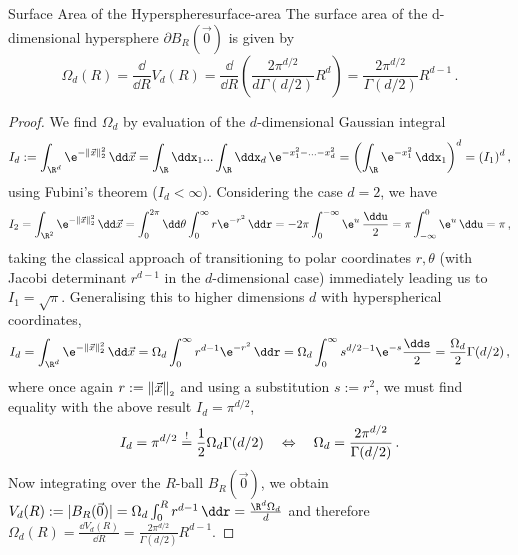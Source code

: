 \begin{lemma}{Surface Area of the Hypersphere}{surface-area}
  The surface area of the d-dimensional hypersphere $\partial B_R(\vec{0})$ is given by
  $$\Omega_{d}(R) = \frac{\dd}{\dd R} V_d(R) = \frac{\dd}{\dd R} \left(\frac{2 \pi^{d/2}}{d \Gamma(d/2)} R^d\right) = \frac{2\pi^{d/2}}{\Gamma({d/2})} R^{d-1}\,.$$
\end{lemma}
\begin{proof}
  We find $\Omega_d$ by evaluation of the $d$-dimensional Gaussian integral
  $$I_d := \int_{\R^d} \e^{-\norm{\vec{x}}^2}\,\dd\vec{x} = \int_{\R} \ddx_1 ... \int_{\R} \ddx_d\, \e^{-x_1^2-...-x_d^2} = \left(\int_{\R} \e^{-x_1^2} \,\ddx_1\right)^d = (I_1)^d\,,$$
  using Fubini's theorem ($I_d < \infty$).
  Considering the case $d = 2$, we have
  $$I_2 = \int_{\R^2} \e^{-\norm{\vec{x}}^2} \,\dd\vec{x} = \int_0^{2\pi} \dd\theta \int_0^\infty r \e^{-r^2} \,\ddr = -2\pi \int_{0}^{-\infty} \e^u \,\frac{\ddu}{2} = \pi \int_{-\infty}^0 \e^u \,\ddu = \pi\,,$$
  taking the classical approach of transitioning to polar coordinates $r, \theta$ (with Jacobi determinant $r^{d-1}$ in the $d$-dimensional case) immediately leading us to $I_1 = \sqrt{\pi}$. Generalising this to higher dimensions $d$ with hyperspherical coordinates,
  $$I_d = \int_{\R^d} \e^{-\norm{\vec{x}}^2} \,\dd\vec{x} = \Omega_d \int_0^\infty r^{d-1} \e^{-r^2}\,\ddr = \Omega_d \int_0^\infty s^{{d/2}-1} \e^{-s} \frac{\dds}{2} = \frac{\Omega_d}{2} \Gamma(d/2)\,,$$
  where once again $r := \left\lVert\vec{x}\right\rVert_{\scriptscriptstyle 2}$ and using a substitution $s := r^2$, we must find equality with the above result $I_d = \pi^{d/2}$,
  $$I_d = \pi^{d/2} \overset{!}{=} \frac{1}{2}\Omega_d \Gamma(d/2) \quad\Leftrightarrow\quad \Omega_d = \frac{2\pi^{d/2}}{\Gamma(d/2)}\,.$$
  Now integrating over the $R$-ball $B_R(\vec{0})$, we obtain $V_d(R) := |B_R(\vec{0})| = \Omega_d \int_0^R r^{d-1} \,\ddr = \frac{\R^d \Omega_d}{d}$ and therefore $\Omega_{d}(R) = \frac{\dd V_d(R)}{\dd R} = \frac{2 \pi^{d/2}}{\Gamma(d/2)}R^{d-1}$.
\end{proof}
